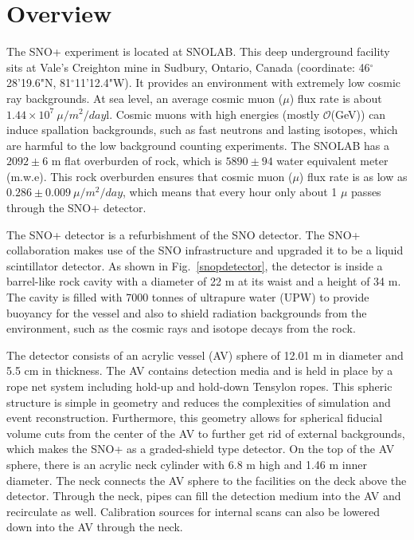 
\section{Overview}\label{sect:overview}
The SNO+ experiment is located at SNOLAB. This deep underground facility sits at Vale's Creighton mine in Sudbury, Ontario, Canada (coordinate: 46$^\circ$28'19.6"N, 81$^\circ$11'12.4"W). It provides an environment with extremely low cosmic ray backgrounds. At sea level, an average cosmic muon ($\mu$) flux rate is about $1.44\times 10^7~\mu/m^2/day$l\cite{muonflux}. Cosmic muons with high energies (mostly $\mathcal{O}$(GeV)) can induce spallation backgrounds, such as fast neutrons and lasting isotopes, which are harmful to the low background counting experiments\cite{beacom2017physics}. The SNOLAB has a $2092\pm6$ m flat overburden of rock, which is $5890\pm94$ water equivalent meter (m.w.e). This rock overburden ensures that cosmic muon ($\mu$) flux rate is as low as $0.286\pm0.009~\mu/m^2/day$\cite{snop_nim}, which means that every hour only about 1 $\mu$ passes through the SNO+ detector. 

The SNO+ detector is a refurbishment of the SNO detector. The SNO+ collaboration makes use of the SNO infrastructure and upgraded it to be a liquid scintillator detector. As shown in Fig.~\ref{snopdetector}, the detector is inside a barrel-like rock cavity with a diameter of 22 m at its waist and a height of 34 m. The cavity is filled with 7000 tonnes of ultrapure water (UPW) to provide buoyancy for the vessel and also to shield radiation backgrounds from the environment, such as the cosmic rays and isotope decays from the rock. 

The detector consists of an acrylic vessel (AV) sphere of 12.01 m in diameter and 5.5 cm in thickness. The AV contains detection media and is held in place by a rope net system including hold-up and hold-down Tensylon ropes. This spheric structure is simple in geometry and reduces the complexities of simulation and event reconstruction. Furthermore, this geometry allows for spherical fiducial volume cuts from the center of the AV to further get rid of external backgrounds, which makes the SNO+ as a graded-shield type detector\cite{waterfield2017optical}.
On the top of the AV sphere, there is an acrylic neck cylinder with 6.8 m high and 1.46 m inner diameter. The neck connects the AV sphere to the facilities on the deck above the detector. Through the neck, pipes can fill the detection medium into the AV and recirculate as well. Calibration sources for internal scans can also be lowered down into the AV through the neck.


